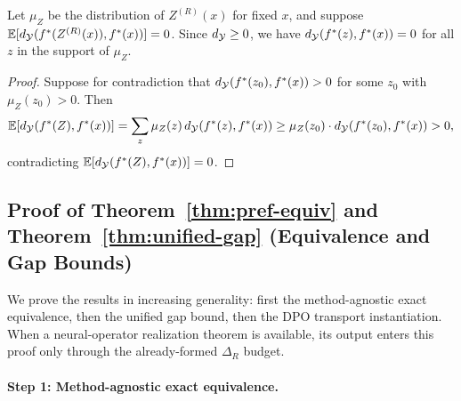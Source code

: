 \begin{lemma}\label{lem:zero-dist-support}
Let $\mu_Z$ be the distribution of $Z^{(R)}(x)$ for fixed $x$, and suppose $\mathbb{E}[d_{\mathcal{Y}}(f^\ast(Z^{(R)}(x)), f^\ast(x))] = 0$. Since $d_{\mathcal{Y}} \ge 0$, we have $d_{\mathcal{Y}}(f^\ast(z), f^\ast(x)) = 0$ for all $z$ in the support of $\mu_Z$.
\end{lemma}

\begin{proof}
Suppose for contradiction that $d_{\mathcal{Y}}(f^\ast(z_0), f^\ast(x)) > 0$ for some $z_0$ with $\mu_Z(z_0) > 0$. Then
\[
\mathbb{E}[d_{\mathcal{Y}}(f^\ast(Z), f^\ast(x))] = \sum_z \mu_Z(z)\,d_{\mathcal{Y}}(f^\ast(z), f^\ast(x)) \ge \mu_Z(z_0) \cdot d_{\mathcal{Y}}(f^\ast(z_0), f^\ast(x)) > 0,
\]
contradicting $\mathbb{E}[d_{\mathcal{Y}}(f^\ast(Z), f^\ast(x))] = 0$.
\end{proof}

\subsection{Proof of Theorem~\ref{thm:pref-equiv} and Theorem~\ref{thm:unified-gap} (Equivalence and Gap Bounds)}\label{app:proof-equivalence}

We prove the results in increasing generality: first the method-agnostic exact equivalence, then the unified gap bound, then the DPO transport instantiation. When a neural-operator realization theorem is available, its output enters this proof only through the already-formed $\Delta_R$ budget.

\paragraph{Step 1: Method-agnostic exact equivalence.}


